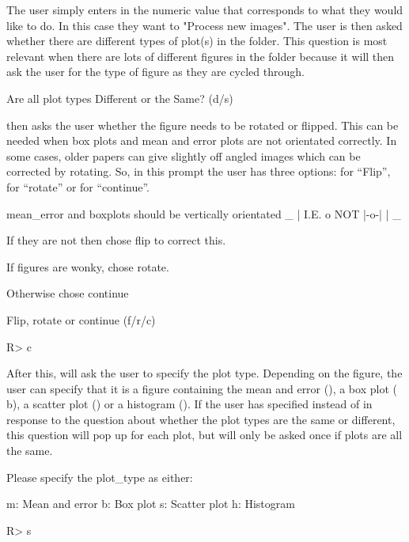 \documentclass[article]{jss}
\newcommand{\fct}[1]{\code{#1()}}
\begin{document}
The user simply enters in the numeric value that corresponds to what they would like to do. In this case they want to "Process new images". The user is then asked whether there are different types of plot(s) in the folder. This question is most relevant when there are lots of different figures in the folder because it will then ask the user for the type of figure as they are cycled through.

\begin{CodeChunk}
\begin{CodeOutput}
Are all plot types Different or the Same? (d/s)
\end{CodeOutput}
\end{CodeChunk}

\fct{metaDigitise} then asks the user whether the figure needs to be rotated or flipped. This can be needed when box plots and mean and error plots are not orientated correctly. In some cases, older papers can give slightly off angled images which can be corrected by rotating. So, in this prompt the user has three options:  for ``Flip'',  for ``rotate'' or  for ``continue''. 

\begin{CodeChunk}
\begin{CodeOutput}
mean_error and boxplots should be vertically orientated
       _ 
       |  
  I.E. o    NOT  |-o-|
       |
       _

If they are not then chose flip to correct this.

If figures are wonky, chose rotate.

Otherwise chose continue

Flip, rotate or continue (f/r/c) 
\end{CodeOutput}
\begin{CodeInput}
R> c
\end{CodeInput}
\end{CodeChunk}

After this, \fct{metaDigitise} will ask the user to specify the plot type. Depending on the figure, the user can specify that it is a figure containing the mean and error (), a box plot (\code
{b}), a scatter plot () or a histogram (). If the user has specified  instead of  in response to the question about whether the plot types are the same or different, this question will pop up for each plot, but will only be asked once if plots are all the same.

\begin{CodeChunk}
\begin{CodeOutput}
Please specify the plot_type as either:

 m: Mean and error
 b: Box plot
 s: Scatter plot 
 h: Histogram
\end{CodeOutput}
\begin{CodeInput}
R> s
\end{CodeInput}
\end{CodeChunk}
\end{document}

